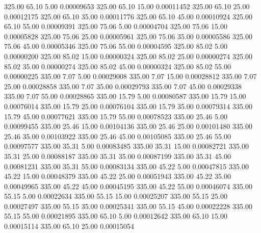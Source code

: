     325.00     65.10      5.00     0.00009653
    325.00     65.10     15.00     0.00011452
    325.00     65.10     25.00     0.00012175
    325.00     65.10     35.00     0.00011776
    325.00     65.10     45.00     0.00010924
    325.00     65.10     55.00     0.00009391
    325.00     75.06      5.00     0.00004704
    325.00     75.06     15.00     0.00005828
    325.00     75.06     25.00     0.00005961
    325.00     75.06     35.00     0.00005586
    325.00     75.06     45.00     0.00005346
    325.00     75.06     55.00     0.00004595
    325.00     85.02      5.00     0.00000200
    325.00     85.02     15.00     0.00000324
    325.00     85.02     25.00     0.00000274
    325.00     85.02     35.00     0.00000274
    325.00     85.02     45.00     0.00000324
    325.00     85.02     55.00     0.00000225
    335.00      7.07      5.00     0.00029008
    335.00      7.07     15.00     0.00028812
    335.00      7.07     25.00     0.00028858
    335.00      7.07     35.00     0.00029793
    335.00      7.07     45.00     0.00029338
    335.00      7.07     55.00     0.00028865
    335.00     15.79      5.00     0.00080587
    335.00     15.79     15.00     0.00076014
    335.00     15.79     25.00     0.00076104
    335.00     15.79     35.00     0.00079314
    335.00     15.79     45.00     0.00077621
    335.00     15.79     55.00     0.00078523
    335.00     25.46      5.00     0.00099455
    335.00     25.46     15.00     0.00104136
    335.00     25.46     25.00     0.00101480
    335.00     25.46     35.00     0.00103922
    335.00     25.46     45.00     0.00105085
    335.00     25.46     55.00     0.00097577
    335.00     35.31      5.00     0.00083485
    335.00     35.31     15.00     0.00082721
    335.00     35.31     25.00     0.00088187
    335.00     35.31     35.00     0.00087199
    335.00     35.31     45.00     0.00081231
    335.00     35.31     55.00     0.00083134
    335.00     45.22      5.00     0.00047815
    335.00     45.22     15.00     0.00048379
    335.00     45.22     25.00     0.00051943
    335.00     45.22     35.00     0.00049965
    335.00     45.22     45.00     0.00045195
    335.00     45.22     55.00     0.00046074
    335.00     55.15      5.00     0.00022634
    335.00     55.15     15.00     0.00025207
    335.00     55.15     25.00     0.00027497
    335.00     55.15     35.00     0.00025341
    335.00     55.15     45.00     0.00022228
    335.00     55.15     55.00     0.00021895
    335.00     65.10      5.00     0.00012642
    335.00     65.10     15.00     0.00015114
    335.00     65.10     25.00     0.00015054
